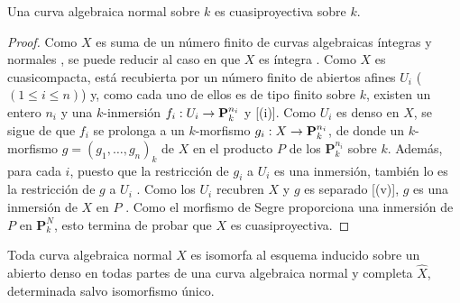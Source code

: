 \documentclass[oneside,10pt]{amsart}
\makeatletter
\renewcommand{\leq}{\leqslant}
\newcommand{\ega@arrow}[2]{\mathchoice{#1}{#2}{#2}{#2}}
\renewcommand{\to}{\ega@arrow{\longrightarrow}{\rightarrow}}
\let\EGAOriginalLabel\label
\renewcommand{\label}[1]{\phantomsection\EGAOriginalLabel{#1}}
\makeatother
\begin{document}
\begin{corollary}[7.4.10]
\label{II.7.4.10-fr}
Una curva algebraica normal sobre $k$ es cuasiproyectiva sobre $k$.
\end{corollary}

\begin{proof}
Como $X$ es suma de un número finito de curvas algebraicas íntegras y normales , se puede reducir al caso en que $X$ es íntegra .
Como $X$ es cuasicompacta, está recubierta por un número finito de abiertos afines $U_i$ ($(1\leq i\leq n)$) y, como cada uno de ellos es de tipo finito sobre $k$, existen un entero $n_i$ y una $k$-inmersión $f_i:U_i\to\mathbf{P}_k^{n_i}$  y [(i)].
Como $U_i$ es denso en $X$, se sigue de  que $f_i$ se prolonga a un $k$-morfismo $g_i:X\to\mathbf{P}_k^{n_i}$, de donde un $k$-morfismo $g=(g_1,\ldots,g_n)_k$ de $X$ en el producto $P$ de los $\mathbf{P}_k^{n_i}$ sobre $k$.
Además, para cada $i$, puesto que la restricción de $g_i$ a $U_i$ es una inmersión, también lo es la restricción de $g$ a $U_i$ .
Como los $U_i$ recubren $X$ y $g$ es separado [(v)], $g$ es una inmersión de $X$ en $P$ .
Como el morfismo de Segre  proporciona una inmersión de $P$ en $\mathbf{P}_k^N$, esto termina de probar que $X$ es cuasiproyectiva.
\end{proof}

\begin{corollary}[7.4.11]
\label{II.7.4.11-fr}
Toda curva algebraica normal $X$ es isomorfa al esquema inducido sobre un abierto denso en todas partes de una curva algebraica normal y completa $\widehat{X}$, determinada salvo isomorfismo único.
\end{corollary}
\end{document}
